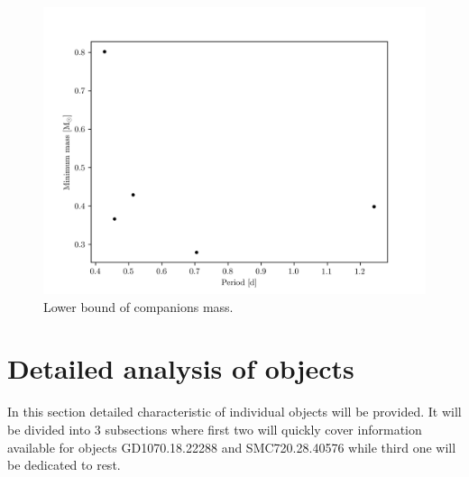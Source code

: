 \documentclass{pracalicmgr}
\begin{document}
\begin{figure}[H]
    \begin{center}
        \includegraphics{plots/mass_minimum_estimate.png}
    \end{center}
    \caption{Lower bound of companions mass.}\label{lower_mass}
\end{figure}

\section{Detailed analysis of objects}
In this section detailed characteristic of individual objects will be provided. It will be divided into $3$ subsections where first two will quickly cover information available for 
objects GD1070.18.22288 and SMC720.28.40576 while third one will be dedicated to rest.
\end{document}
